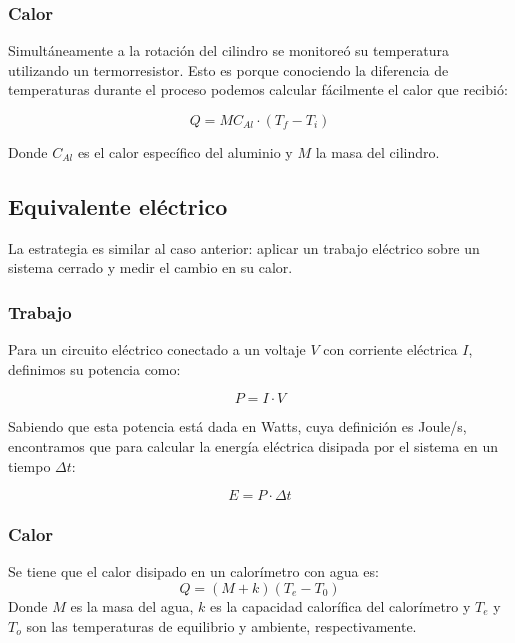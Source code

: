 \documentclass{article}
\begin{document}
\subsubsection{Calor}
Simultáneamente a la rotación del cilindro se monitoreó su temperatura utilizando un termorresistor. Esto es porque conociendo la diferencia de temperaturas durante el proceso podemos calcular fácilmente el calor que recibió:

\begin{equation}
    Q = M C_{Al} \cdot (T_f-T_i)
    \label{eq:mecq}
\end{equation}

Donde $C_{Al}$ es el calor específico del aluminio y $M$ la masa del cilindro.\cite{pasco}

\subsection{Equivalente eléctrico}
La estrategia es similar al caso anterior: aplicar un trabajo eléctrico sobre un sistema cerrado y medir el cambio en su calor.

\subsubsection{Trabajo}
Para un circuito eléctrico conectado a un voltaje $V$ con corriente eléctrica $I$, definimos su potencia como\cite{purcell}:

\begin{equation}
    P=I\cdot V
\end{equation}

Sabiendo que esta potencia está dada en Watts, cuya definición es Joule/s, encontramos que para calcular la energía eléctrica disipada por el sistema en un tiempo $\Delta t$:

\begin{equation}
    E=P\cdot\Delta t 
    \label{energia}
\end{equation}

\subsubsection{Calor}
Se tiene que el calor disipado en un calorímetro con agua es:
\begin{equation}
    Q=(M+k)(T_e - T_0) 
    \label{calor}
\end{equation}
Donde $M$ es la masa del agua, $k$ es la capacidad calorífica del calorímetro y $T_e$ y $T_o$ son las temperaturas de equilibrio y ambiente, respectivamente.\\
\end{document}
